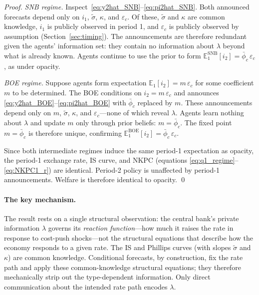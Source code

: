 \begin{proof}
\textit{SNB regime.} Inspect~\eqref{eq:y2hat_SNB}--\eqref{eq:pi2hat_SNB}. Both
announced forecasts depend only on $i_1$, $\tilde{\sigma}$, $\kappa$, and
$\varepsilon_c$. Of these, $\tilde{\sigma}$ and $\kappa$ are common knowledge,
$i_1$ is publicly observed in period 1, and $\varepsilon_c$ is publicly observed
by assumption (Section~\ref{sec:timing}). The announcements are therefore redundant
given the agents' information set: they contain no information about $\lambda$ beyond
what is already known. Agents continue to use the prior to form
$\mathbb{E}_1^{\mathrm{SNB}}[i_2] = \bar{\phi}_c\,\varepsilon_c$, as under opacity.

\textit{BOE regime.} Suppose agents form expectation
$\mathbb{E}_1[i_2] = m\,\varepsilon_c$ for some coefficient $m$ to be determined.
The BOE conditions on $i_2 = m\,\varepsilon_c$ and announces
\eqref{eq:y2hat_BOE}--\eqref{eq:pi2hat_BOE} with $\bar{\phi}_c$ replaced by $m$.
These announcements depend only on $m$, $\tilde{\sigma}$, $\kappa$, and
$\varepsilon_c$---none of which reveal $\lambda$. Agents learn nothing about
$\lambda$ and update $m$ only through prior beliefs: $m = \bar{\phi}_c$.
The fixed point $m = \bar{\phi}_c$ is therefore unique, confirming
$\mathbb{E}_1^{\mathrm{BOE}}[i_2] = \bar{\phi}_c\,\varepsilon_c$.

Since both intermediate regimes induce the same period-1 expectation as opacity, the
period-1 exchange rate, IS curve, and NKPC (equations
\eqref{eq:q1_regime}--\eqref{eq:NKPC1_r}) are identical. Period-2 policy is
unaffected by period-1 announcements. Welfare is therefore identical to opacity.
\qed
\end{proof}

\paragraph{The key mechanism.}
The result rests on a single structural observation: the central bank's private
information $\lambda$ governs its \emph{reaction function}---how much it raises the
rate in response to cost-push shocks---not the structural equations that describe
how the economy responds to a given rate. The IS and Phillips curves (with slopes
$\tilde{\sigma}$ and $\kappa$) are common knowledge. Conditional forecasts, by
construction, fix the rate path and apply these common-knowledge structural
equations; they therefore mechanically strip out the type-dependent information.
Only direct communication about the intended rate path encodes $\lambda$.

